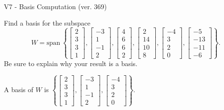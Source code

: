 \begin{exercise}
  \begin{exerciseTitle}V7 - Basis Computation (ver. 369)\end{exerciseTitle}
  \begin{exerciseStatement}
    Find a basis for the subspace 
\[W=\mathrm{span}\ \left\{\left[\begin{array}{r}
2 \\
3 \\
3 \\
1
\end{array}\right] , \left[\begin{array}{r}
-3 \\
1 \\
-1 \\
2
\end{array}\right] , \left[\begin{array}{r}
4 \\
6 \\
6 \\
2
\end{array}\right] , \left[\begin{array}{r}
2 \\
14 \\
10 \\
8
\end{array}\right] , \left[\begin{array}{r}
-4 \\
3 \\
2 \\
0
\end{array}\right] , \left[\begin{array}{r}
-5 \\
-13 \\
-11 \\
-6
\end{array}\right]\right\}.\]
 Be sure to explain why your result is a basis.


  \end{exerciseStatement}
  \begin{exerciseAnswer}
   A basis of \(W\) is  \(\left\{\left[\begin{array}{r}
2 \\
3 \\
3 \\
1
\end{array}\right] , \left[\begin{array}{r}
-3 \\
1 \\
-1 \\
2
\end{array}\right] , \left[\begin{array}{r}
-4 \\
3 \\
2 \\
0
\end{array}\right]\right\}\).
  


  \end{exerciseAnswer}
\end{exercise}